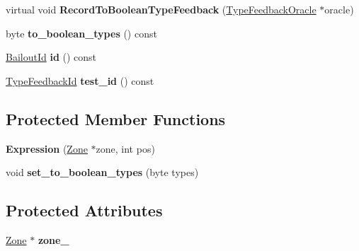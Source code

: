\begin{DoxyCompactItemize}
\item 
\hypertarget{classv8_1_1internal_1_1_expression_a2d0193f5251cfe78478331420c758bff}{}virtual void {\bfseries Record\+To\+Boolean\+Type\+Feedback} (\hyperlink{classv8_1_1internal_1_1_type_feedback_oracle}{Type\+Feedback\+Oracle} $\ast$oracle)\label{classv8_1_1internal_1_1_expression_a2d0193f5251cfe78478331420c758bff}

\item 
\hypertarget{classv8_1_1internal_1_1_expression_a86a9152bd4143010575a238106527f20}{}byte {\bfseries to\+\_\+boolean\+\_\+types} () const \label{classv8_1_1internal_1_1_expression_a86a9152bd4143010575a238106527f20}

\item 
\hypertarget{classv8_1_1internal_1_1_expression_afc64c0e0bef05c44204e1c302fa44117}{}\hyperlink{classv8_1_1internal_1_1_bailout_id}{Bailout\+Id} {\bfseries id} () const \label{classv8_1_1internal_1_1_expression_afc64c0e0bef05c44204e1c302fa44117}

\item 
\hypertarget{classv8_1_1internal_1_1_expression_a8d03a18cbeee4debbe709e242c05dfc8}{}\hyperlink{classv8_1_1internal_1_1_type_feedback_id}{Type\+Feedback\+Id} {\bfseries test\+\_\+id} () const \label{classv8_1_1internal_1_1_expression_a8d03a18cbeee4debbe709e242c05dfc8}

\end{DoxyCompactItemize}
\subsection*{Protected Member Functions}
\begin{DoxyCompactItemize}
\item 
\hypertarget{classv8_1_1internal_1_1_expression_a46d9647e4fed591b56c34685f53c6a1d}{}{\bfseries Expression} (\hyperlink{classv8_1_1internal_1_1_zone}{Zone} $\ast$zone, int pos)\label{classv8_1_1internal_1_1_expression_a46d9647e4fed591b56c34685f53c6a1d}

\item 
\hypertarget{classv8_1_1internal_1_1_expression_a37b214a937b147afb5180e518379cb2e}{}void {\bfseries set\+\_\+to\+\_\+boolean\+\_\+types} (byte types)\label{classv8_1_1internal_1_1_expression_a37b214a937b147afb5180e518379cb2e}

\end{DoxyCompactItemize}
\subsection*{Protected Attributes}
\begin{DoxyCompactItemize}
\item 
\hypertarget{classv8_1_1internal_1_1_expression_a6ff35dfd23465ea89b58a6bfb10a4ac0}{}\hyperlink{classv8_1_1internal_1_1_zone}{Zone} $\ast$ {\bfseries zone\+\_\+}\label{classv8_1_1internal_1_1_expression_a6ff35dfd23465ea89b58a6bfb10a4ac0}

\end{DoxyCompactItemize}
